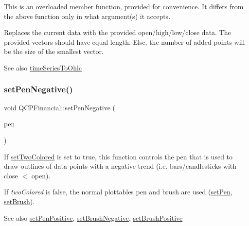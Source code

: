 This is an overloaded member function, provided for convenience. It differs from the above function only in what argument(s) it accepts.

Replaces the current data with the provided open/high/low/close data. The provided vectors should have equal length. Else, the number of added points will be the size of the smallest vector.

\begin{DoxySeeAlso}{See also}
\hyperlink{class_q_c_p_financial_a0c3453d1c03e320950fdd2df54e3ebc8}{time\+Series\+To\+Ohlc} 
\end{DoxySeeAlso}
\hypertarget{class_q_c_p_financial_afe5c07e94ccea01a75b3a2476993c346}{}\label{class_q_c_p_financial_afe5c07e94ccea01a75b3a2476993c346} 
\subsubsection{\texorpdfstring{set\+Pen\+Negative()}{setPenNegative()}}
{\footnotesize\ttfamily void Q\+C\+P\+Financial\+::set\+Pen\+Negative (\begin{DoxyParamCaption}\item[{const Q\+Pen \&}]{pen }\end{DoxyParamCaption})}

If \hyperlink{class_q_c_p_financial_a138e44aac160a17a9676652e240c5f08}{set\+Two\+Colored} is set to true, this function controls the pen that is used to draw outlines of data points with a negative trend (i.\+e. bars/candlesticks with close $<$ open).

If {\itshape two\+Colored} is false, the normal plottable\textquotesingle{}s pen and brush are used (\hyperlink{class_q_c_p_abstract_plottable_ab74b09ae4c0e7e13142fe4b5bf46cac7}{set\+Pen}, \hyperlink{class_q_c_p_abstract_plottable_a7a4b92144dca6453a1f0f210e27edc74}{set\+Brush}).

\begin{DoxySeeAlso}{See also}
\hyperlink{class_q_c_p_financial_ac58aa3adc7a35aab0088764b840683e5}{set\+Pen\+Positive}, \hyperlink{class_q_c_p_financial_a8bbdd87629f9144b3ef51af660c0961a}{set\+Brush\+Negative}, \hyperlink{class_q_c_p_financial_a5ebff2b1764efd07cc44942e67821829}{set\+Brush\+Positive} 
\end{DoxySeeAlso}
\hypertarget{class_q_c_p_financial_ac58aa3adc7a35aab0088764b840683e5}{}\label{class_q_c_p_financial_ac58aa3adc7a35aab0088764b840683e5} 
